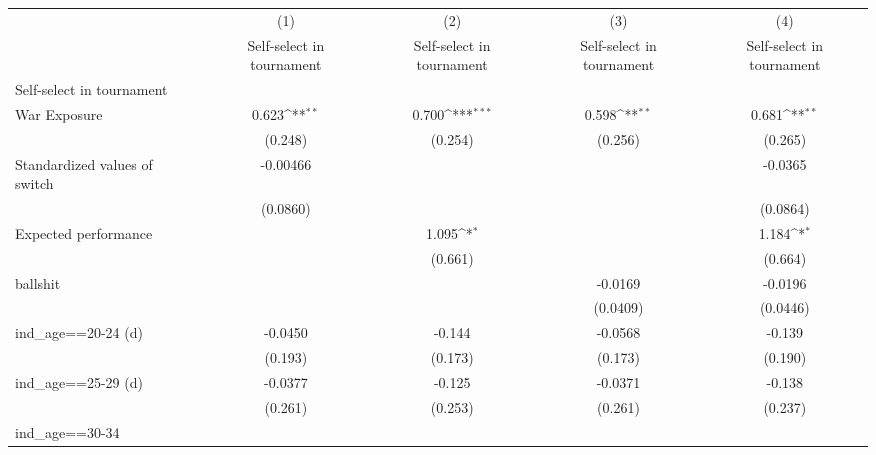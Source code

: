 {
\def\sym#1{\ifmmode^{#1}\else\(^{#1}\)\fi}
\begin{tabular}{l*{4}{c}}
\hline\hline
                    &\multicolumn{1}{c}{(1)}&\multicolumn{1}{c}{(2)}&\multicolumn{1}{c}{(3)}&\multicolumn{1}{c}{(4)}\\
                    &\multicolumn{1}{c}{Self-select in tournament}&\multicolumn{1}{c}{Self-select in tournament}&\multicolumn{1}{c}{Self-select in tournament}&\multicolumn{1}{c}{Self-select in tournament}\\
\hline
Self-select in tournament&                     &                     &                     &                     \\
War Exposure        &       0.623\sym{**} &       0.700\sym{***}&       0.598\sym{**} &       0.681\sym{**} \\
                    &     (0.248)         &     (0.254)         &     (0.256)         &     (0.265)         \\
[1em]
Standardized values of switch&    -0.00466         &                     &                     &     -0.0365         \\
                    &    (0.0860)         &                     &                     &    (0.0864)         \\
[1em]
Expected performance&                     &       1.095\sym{*}  &                     &       1.184\sym{*}  \\
                    &                     &     (0.661)         &                     &     (0.664)         \\
[1em]
ballshit            &                     &                     &     -0.0169         &     -0.0196         \\
                    &                     &                     &    (0.0409)         &    (0.0446)         \\
[1em]
ind\_age==20-24 (d)  &     -0.0450         &      -0.144         &     -0.0568         &      -0.139         \\
                    &     (0.193)         &     (0.173)         &     (0.173)         &     (0.190)         \\
[1em]
ind\_age==25-29 (d)  &     -0.0377         &      -0.125         &     -0.0371         &      -0.138         \\
                    &     (0.261)         &     (0.253)         &     (0.261)         &     (0.237)         \\
[1em]
ind\_age==30-34      &                     &                     &                     &                     \\

\end{tabular}}
